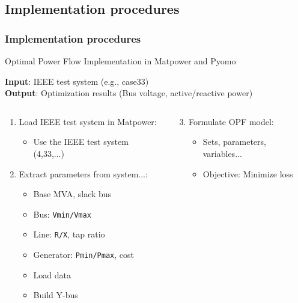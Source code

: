 \documentclass[
	11pt, %
	aspectratio=169, %
]{beamer}
\begin{document}
\subsection{Implementation procedures}
\begin{frame}
	\frametitle{Implementation procedures}
	
	\begin{algorithm}[H]
		\footnotesize %
		\caption{Optimal Power Flow Implementation in Matpower and Pyomo}
		\textbf{Input}: IEEE test system (e.g., case33) \\
		\textbf{Output}: Optimization results (Bus voltage, active/reactive power)
	
	\begin{columns}[T]
		\begin{column}{0.48\textwidth}	
			\begin{enumerate}
			\item Load IEEE test system in Matpower:
			\begin{itemize}
				\item Use the IEEE test system (4,33,...)
			\end{itemize}

			\item Extract parameters from system...:
			\begin{itemize}
				\item Base MVA, slack bus
				\item Bus: \texttt{Vmin/Vmax}
				\item Line: \texttt{R/X}, tap ratio
				\item Generator: \texttt{Pmin/Pmax}, cost
				\item Load data
				\item Build Y-bus
			\end{itemize}

			\end{enumerate}
		\end{column}
		
		\begin{column}{0.48\textwidth}
			\begin{enumerate}
    		\setcounter{enumi}{2}
			
			\item Formulate OPF model:
				\begin{itemize}
					\item Sets, parameters, variables...
					\item Objective: Minimize loss
				\end{itemize}


\end{enumerate}
\end{column}
\end{columns}
\end{algorithm}
\end{frame}
\end{document}
